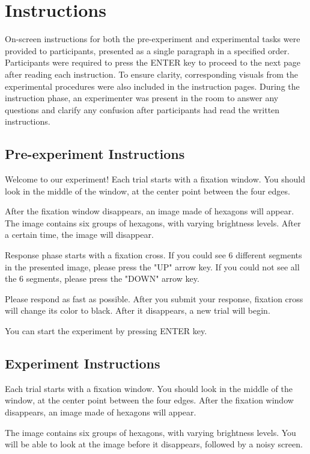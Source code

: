 \documentclass{article}
\begin{document}
\section{Instructions} \label{Instructions}
On-screen instructions for both the pre-experiment and experimental tasks were provided to participants, presented as a single paragraph in a specified order. Participants were required to press the ENTER key to proceed to the next page after reading each instruction. To ensure clarity, corresponding visuals from the experimental procedures were also included in the instruction pages. During the instruction phase, an experimenter was present in the room to answer any questions and clarify any confusion after participants had read the written instructions. 

\clearpage

\subsection{Pre-experiment Instructions}
Welcome to our experiment!
Each trial starts with a fixation window.
You should look in the middle of the window, at the center point between the four edges.

After the fixation window disappears, an image made of hexagons will appear.
The image contains six groups of hexagons, with varying brightness levels.
After a certain time, the image will disappear.

Response phase starts with a fixation cross.
If you could see 6 different segments in the presented image, please press the "UP" arrow key.
If you could not see all the 6 segments, please press the "DOWN" arrow key.

Please respond as fast as possible.
After you submit your response, fixation cross will change its color to black.
After it disappears, a new trial will begin.


You can start the experiment by pressing ENTER key.
\clearpage

\subsection{Experiment Instructions}
Each trial starts with a fixation window.
You should look in the middle of the window, at the center point between the four edges. After the fixation window disappears, an image made of hexagons will appear.

The image contains six groups of hexagons, with varying brightness levels.
You will be able to look at the image before it disappears, followed by a noisy screen.
\end{document}

